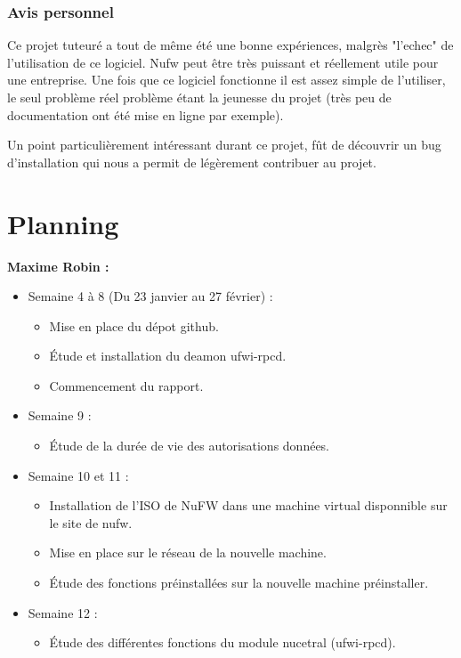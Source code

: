 \documentclass[12pt]{report}
\begin{document}
\begin{itemize}
\subsection{Avis personnel}


Ce projet tuteuré a tout de même été une bonne expériences, malgrès "l'echec" de l'utilisation de ce logiciel. 
Nufw peut être très puissant et réellement utile pour une entreprise. Une fois que ce logiciel fonctionne il est assez 
simple de l'utiliser, le seul problème réel problème étant la jeunesse du projet (très peu de documentation ont été mise en ligne par exemple).

Un point particulièrement intéressant durant ce projet, fût de découvrir un bug d'installation qui nous a permit de légèrement contribuer au projet.

\chapter{Planning}
\textbf{Maxime Robin :}
\begin{itemize}
  \item Semaine 4 à 8 (Du 23 janvier au 27 février) :
  \begin{itemize}
    \item Mise en place du dépot github.
    \item Étude et installation du deamon ufwi-rpcd.
    \item Commencement du rapport.
  \end{itemize}
  \item Semaine 9 :
  \begin{itemize}
    \item Étude de la durée de vie des autorisations données.
  \end{itemize}
  \item Semaine 10 et 11 :
  \begin{itemize}
    \item Installation de l'ISO de NuFW dans une machine virtual disponnible sur le site de nufw.
    \item Mise en place sur le réseau de la nouvelle machine.
    \item Étude des fonctions préinstallées sur la nouvelle machine préinstaller.
  \end{itemize}
  \item Semaine 12 :
  \begin{itemize}
    \item Étude des différentes fonctions du module nucetral (ufwi-rpcd).
  \end{itemize}
\end{itemize}


\end{itemize}
\end{document}
